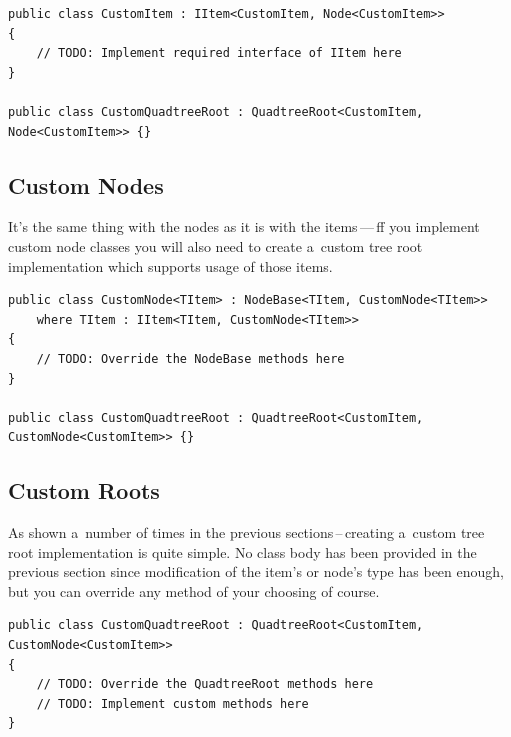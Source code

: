 \documentclass{article}
\begin{document}
\begin{verbatim}
public class CustomItem : IItem<CustomItem, Node<CustomItem>>
{
    // TODO: Implement required interface of IItem here
}

public class CustomQuadtreeRoot : QuadtreeRoot<CustomItem, Node<CustomItem>> {}
\end{verbatim}

\subsection{Custom Nodes} \label{extensions:custom_nodes}
It's the same thing with the nodes as it is with the items\,---\,ff you implement custom node classes you will also need to create a~custom tree root implementation which supports usage of those items.

\begin{verbatim}
public class CustomNode<TItem> : NodeBase<TItem, CustomNode<TItem>>
    where TItem : IItem<TItem, CustomNode<TItem>>
{
    // TODO: Override the NodeBase methods here
}

public class CustomQuadtreeRoot : QuadtreeRoot<CustomItem, CustomNode<CustomItem>> {}
\end{verbatim}

\subsection{Custom Roots} \label{extensions:custom_roots}
As shown a~number of times in the previous sections\,--\,creating a~custom tree root implementation is quite simple.
No class body has been provided in the previous section since modification of the item's or node's type has been enough, but you can override any method of your choosing of course.

\begin{verbatim}
public class CustomQuadtreeRoot : QuadtreeRoot<CustomItem, CustomNode<CustomItem>>
{
    // TODO: Override the QuadtreeRoot methods here
    // TODO: Implement custom methods here
}
\end{verbatim}
\end{document}
